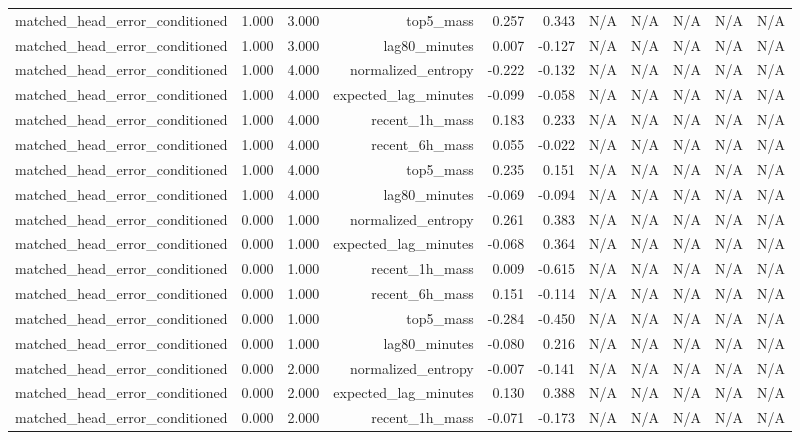 \begin{table}[h!]
\begin{tabular}{lrrrrrrrrrr}
matched\_head\_error\_conditioned & 1.000 & 3.000 & top5\_mass & 0.257 & 0.343 & N/A & N/A & N/A & N/A & N/A \\
matched\_head\_error\_conditioned & 1.000 & 3.000 & lag80\_minutes & 0.007 & -0.127 & N/A & N/A & N/A & N/A & N/A \\
matched\_head\_error\_conditioned & 1.000 & 4.000 & normalized\_entropy & -0.222 & -0.132 & N/A & N/A & N/A & N/A & N/A \\
matched\_head\_error\_conditioned & 1.000 & 4.000 & expected\_lag\_minutes & -0.099 & -0.058 & N/A & N/A & N/A & N/A & N/A \\
matched\_head\_error\_conditioned & 1.000 & 4.000 & recent\_1h\_mass & 0.183 & 0.233 & N/A & N/A & N/A & N/A & N/A \\
matched\_head\_error\_conditioned & 1.000 & 4.000 & recent\_6h\_mass & 0.055 & -0.022 & N/A & N/A & N/A & N/A & N/A \\
matched\_head\_error\_conditioned & 1.000 & 4.000 & top5\_mass & 0.235 & 0.151 & N/A & N/A & N/A & N/A & N/A \\
matched\_head\_error\_conditioned & 1.000 & 4.000 & lag80\_minutes & -0.069 & -0.094 & N/A & N/A & N/A & N/A & N/A \\
matched\_head\_error\_conditioned & 0.000 & 1.000 & normalized\_entropy & 0.261 & 0.383 & N/A & N/A & N/A & N/A & N/A \\
matched\_head\_error\_conditioned & 0.000 & 1.000 & expected\_lag\_minutes & -0.068 & 0.364 & N/A & N/A & N/A & N/A & N/A \\
matched\_head\_error\_conditioned & 0.000 & 1.000 & recent\_1h\_mass & 0.009 & -0.615 & N/A & N/A & N/A & N/A & N/A \\
matched\_head\_error\_conditioned & 0.000 & 1.000 & recent\_6h\_mass & 0.151 & -0.114 & N/A & N/A & N/A & N/A & N/A \\
matched\_head\_error\_conditioned & 0.000 & 1.000 & top5\_mass & -0.284 & -0.450 & N/A & N/A & N/A & N/A & N/A \\
matched\_head\_error\_conditioned & 0.000 & 1.000 & lag80\_minutes & -0.080 & 0.216 & N/A & N/A & N/A & N/A & N/A \\
matched\_head\_error\_conditioned & 0.000 & 2.000 & normalized\_entropy & -0.007 & -0.141 & N/A & N/A & N/A & N/A & N/A \\
matched\_head\_error\_conditioned & 0.000 & 2.000 & expected\_lag\_minutes & 0.130 & 0.388 & N/A & N/A & N/A & N/A & N/A \\
matched\_head\_error\_conditioned & 0.000 & 2.000 & recent\_1h\_mass & -0.071 & -0.173 & N/A & N/A & N/A & N/A & N/A \\

\end{tabular}
\end{table}
